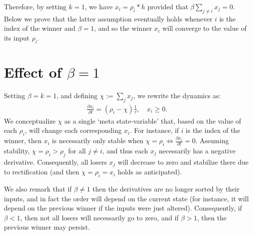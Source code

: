 Therefore, by setting $k = 1$, we have $x_i = \rho_i \ast h$ provided that $\beta \sum_{j \ne i} x_j = 0$.
Below we prove that the latter assumption eventually holds whenever $i$ is the index of the winner and $\beta = 1$, and so the winner $x_i$ will converge to the value of its input $\rho_i$.


\section{Effect of $\beta = 1$}

Setting $\beta = k = 1$, and defining $\chi := \sum_j x_j$, we rewrite the dynamics as:
\begin{equation} \label{eq:um-special}
    \begin{split}
        \frac{{\partial x}_i}{\partial t} = \left(\rho_i - \chi \right) \frac{1}{\tau}, \quad x_i \ge 0.
    \end{split}
\end{equation}
We conceptualize $\chi$ as a single `meta state-variable' that, based on the value of each $\rho_i$, will change each corresponding $x_i$.
For instance, if $i$ is the index of the winner, then $x_i$ is necessarily only stable when $\chi = \rho_i \iff \frac{{\partial x}_i}{\partial t} = 0$.
Assuming stability, $\chi = \rho_i > \rho_j$ for all $j \ne i$, and thus each $x_j$ necessarily has a negative derivative.
Consequently, all losers $x_j$ will decrease to zero and stabilize there due to rectification (and then $\chi = \rho_i = x_i$ holds as anticipated).

We also remark that if $\beta \ne 1$ then the derivatives are no longer sorted by their inputs, and in fact the order will depend on the current state (for instance, it will depend on the previous winner if the inputs were just altered). Consequently, if $\beta < 1$, then not all losers will necessarily go to zero, and if $\beta > 1$, then the previous winner may persist.
